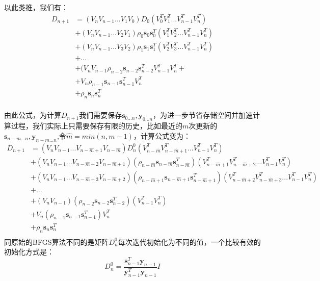 以此类推，我们有：
\begin{displaymath}
\begin{split}
D_{n+1}&=(V_nV_{n-1}...V_1V_0)D_0(V_0^TV_1^T...V_{n-1}^TV_n^T)\\
      &+(V_nV_{n-1}...V_2V_1)\rho_0\mathbf{s}_0\mathbf{s}_0^T(V_1^TV_2^T...V_{n-1}^TV_n^T)\\
      &+(V_nV_{n-1}...V_3V_2)\rho_1\mathbf{s}_1\mathbf{s}_1^T(V_2^TV_3^T...V_{n-1}^TV_n^T)\\
      &+...\\
      &+(V_nV_{n-1}\rho_{n-2}\mathbf{s}_{n-2}\mathbf{s}_{n-2}^TV_{n-1}^TV_n^T+\\
      &+V_n\rho_{n-1}\mathbf{s}_{n-1}\mathbf{s}_{n-1}^TV_n^T\\
      &+\rho_n\mathbf{s}_n\mathbf{s}_n^T\\
\end{split}
\end{displaymath}

由此公式，为计算$D_{n+1}$我们需要保存$\mathbf{s}_{0...n}, \mathbf{y}_{0...n}$，为进一步节省存储空间并加速计算过程，我们实际上只需要保存有限的历史，比如最近的$m$次更新的$\mathbf{s}_{n-m...n}, \mathbf{y}_{n-m...n}$,令$\hat{m}=min(n, m-1)$，计算公式变为：
\begin{displaymath}
\begin{split}
D_{n+1}&=(V_nV_{n-1}...V_{n-\hat{m}+1}V_{n-\hat{m}})D_n^0(V_{n-\hat{m}}^TV_{n-\hat{m}+1}^T...V_{n-1}^TV_n^T)\\
      &+(V_nV_{n-1}...V_{n-\hat{m}+2}V_{n-\hat{m}+1})(\rho_{n-\hat{m}}\mathbf{s}_{n-\hat{m}}\mathbf{s}_{n-\hat{m}}^T)(V_{n-\hat{m}+1}^TV_{n-\hat{m}+2}^T...V_{n-1}^TV_n^T)\\
      &+(V_nV_{n-1}...V_{n-\hat{m}+3}V_{n-\hat{m}+2})(\rho_{n-\hat{m}+1}\mathbf{s}_{n-\hat{m}+1}\mathbf{s}_{n-\hat{m}+1}^T)(V_{n-\hat{m}+2}^TV_{n-\hat{m}+3}^T...V_{n-1}^TV_n^T)\\
      &+...\\
      &+(V_nV_{n-1})(\rho_{n-2}\mathbf{s}_{n-2}\mathbf{s}_{n-2}^T)(V_{n-1}^TV_n^T)\\
      &+V_n(\rho_{n-1}\mathbf{s}_{n-1}\mathbf{s}_{n-1}^T)V_n^T\\
      &+\rho_n\mathbf{s}_n\mathbf{s}_n^T\\
\end{split}
\end{displaymath}
同原始的BFGS算法不同的是矩阵$D_n^0$每次迭代初始化为不同的值，一个比较有效的初始化方式是：
\begin{displaymath}
D_n^0 = \frac{\mathbf{s}_{n-1}^{T}\mathbf{y}_{n-1}}{\mathbf{y}_{n-1}^T\mathbf{y}_{n-1}}I
\end{displaymath}

